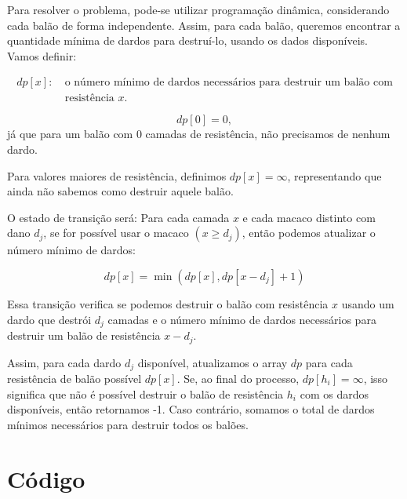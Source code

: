 Para resolver o problema, pode-se utilizar programação dinâmica, considerando cada balão de forma independente. Assim, para cada balão, queremos encontrar a quantidade mínima de dardos para destruí-lo, usando os dados disponíveis. Vamos definir:

\[
\begin{align*}
dp[x]: &\ \text{o número mínimo de dardos necessários para destruir um balão com} \\
       &\ \text{resistência } x.
\end{align*}
\]

\[
dp[0] = 0,
\]
já que para um balão com 0 camadas de resistência, não precisamos de nenhum dardo.

Para valores maiores de resistência, definimos \(dp[x] = \infty\), representando que ainda não sabemos como destruir aquele balão.

O estado de transição será:
Para cada camada \(x\) e cada macaco distinto com dano \(d_j\), se for possível usar o macaco \((x \geq d_j)\), então podemos atualizar o número mínimo de dardos:

\[
dp[x] = \min(dp[x], dp[x - d_j] + 1)
\]

Essa transição verifica se podemos destruir o balão com resistência \(x\) usando um dardo que destrói \(d_j\) camadas e o número mínimo de dardos necessários para destruir um balão de resistência \(x - d_j\).

Assim, para cada dardo \(d_j\) disponível, atualizamos o array \(dp\) para cada resistência de balão possível \(dp[x]\). Se, ao final do processo, \(dp[h_i] = \infty\), isso significa que não é possível destruir o balão de resistência \(h_i\) com os dardos disponíveis, então retornamos -1. Caso contrário, somamos o total de dardos mínimos necessários para destruir todos os balões.


\newpage

\section*{Código}

